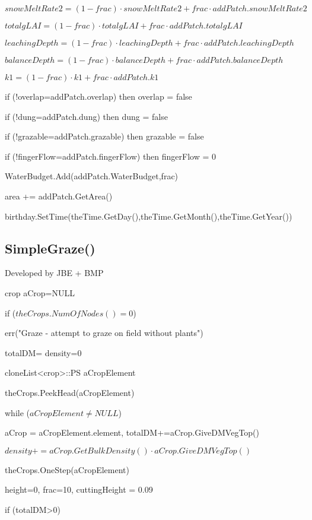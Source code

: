 \documentclass[%
]{scrartcl}
\begin{document}
  $snowMeltRate2 = (1-frac) \cdot snowMeltRate2+frac \cdot addPatch.snowMeltRate2$
   
$totalgLAI = (1-frac) \cdot totalgLAI+frac \cdot addPatch.totalgLAI$
   
$leachingDepth = (1-frac) \cdot leachingDepth+frac \cdot addPatch.leachingDepth$
  
 $balanceDepth = (1-frac) \cdot balanceDepth+frac \cdot addPatch.balanceDepth$
  
 $k1 = (1-frac) \cdot k1+frac \cdot addPatch.k1$
  
 if (!overlap=addPatch.overlap) then
   	overlap = false
 
 
   if (!dung=addPatch.dung) then
   	dung = false
  
  
   if (!grazable=addPatch.grazable) then
   	grazable = false
  
  
   if (!fingerFlow=addPatch.fingerFlow) then
   	fingerFlow = 0
 
 
   WaterBudget.Add(addPatch.WaterBudget,frac)
  
   area += addPatch.GetArea()
 
   birthday.SetTime(theTime.GetDay(),theTime.GetMonth(),theTime.GetYear())





\subsection{SimpleGraze()}
Developed by JBE + BMP

   crop  aCrop=NULL
   
   if ($theCrops.NumOfNodes()=0$)
   
    \quad   err("Graze - attempt to graze on field without plants")

     totalDM= density=0

   cloneList<crop>::PS aCropElement

   theCrops.PeekHead(aCropElement)

   while ($aCropElement\ne NULL$)

    \quad   aCrop = aCropElement.element,      
      totalDM+=aCrop.GiveDMVegTop()
      
     \quad  $density+=aCrop.GetBulkDensity() \cdot aCrop.GiveDMVegTop()$
      
    \quad   theCrops.OneStep(aCropElement)

   height=0, frac=10, cuttingHeight = 0.09
   
   if (totalDM>0)
   
\end{document}
